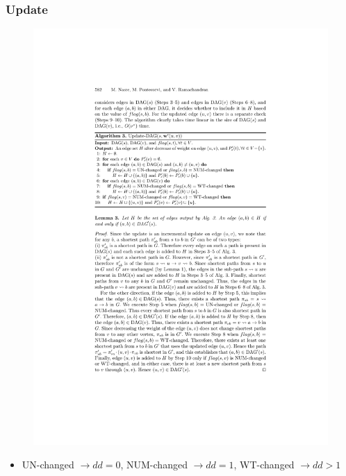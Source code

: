 \begin{frame}
  \frametitle{\spdag Update}

  \begin{figure}[H]
    \centering
    \includegraphics[width=\textwidth]{imgs/npr14-algo3}
  \end{figure}
  
  \begin{itemize}
    \item UN-changed $\rightarrow dd=0$, NUM-changed $\rightarrow dd=1$, WT-changed $\rightarrow dd>1$
  \end{itemize}
\end{frame}


